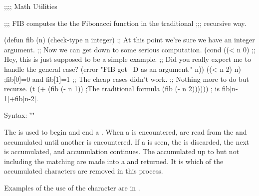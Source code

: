 \code
;;;; Math Utilities

;;; FIB computes the the Fibonacci function in the traditional
;;; recursive way.

(defun fib (n)
  (check-type n integer)
  ;; At this point we're sure we have an integer argument.
  ;; Now we can get down to some serious computation.
  (cond ((< n 0)
         ;; Hey, this is just supposed to be a simple example.
         ;; Did you really expect me to handle the general case?
         (error "FIB got ~D as an argument." n))
        ((< n 2) n)             ;fib[0]=0 and fib[1]=1
        ;; The cheap cases didn't work.
        ;; Nothing more to do but recurse.
        (t (+ (fib (- n 1))     ;The traditional formula
              (fib (- n 2)))))) ; is fib[n-1]+fib[n-2].
\endcode

\endsubsubsubsubsection%

\endsubsubsubsection%

\endsubsubsection%

\endsubsection%


\b{Syntax:} \f{""}


The  is used to begin and end a .
When a  is encountered,
 are read from the   
and accumulated until another  is encountered.
If a   is seen,
the   is discarded,
the next  is accumulated, and accumulation continues.
The accumulated  
up to but not including the matching  
are made into a  and returned.
It is 
which  of the accumulated characters are removed in this process.

Examples of the use of the  character are in \thenextfigure. 


